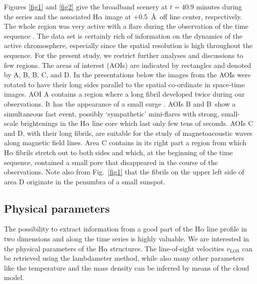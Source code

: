 \vspace{2cm}
\pagebreak
Figures \ref{fig1} and \ref{fig2} give the broadband scenery at $t=40.9$ minutes during the series and the associated H$\alpha$ image at $+$0.5~\AA\ off line center, respectively. The whole region was very active with a flare during the observation of the time sequence \citep{2007msfa.conf..273S}. The data set is certainly rich of information on the dynamics of the active chromosphere, especially since the spatial resolution is high throughout the sequence. For the present study, we restrict further analyses and discussions to few regions. The areas of interest (AOIs) are indicated by rectangles and denoted by A, B, B\arcmin, C, and D. In the presentations below the images from the AOIs were rotated to have their long sides parallel to the spatial co-ordinate in space-time images. AOI A contains a region where a long fibril developed twice during our observations. It has the appearance of a small surge \citep{1977ASSL...69...97T}. AOIs B and B\arcmin\ show a simultaneous fast event, possibly `sympathetic' mini-flares with strong, small-scale brightenings in the H$\alpha$ line core which last only few tens of seconds. AOIs C and D, with their long fibrils, are suitable for the study of magnetoacoustic waves along magnetic field lines. Area C contains in its right part a region from which H$\alpha$ fibrils stretch out to both sides and which, at the beginning of the time sequence, contained a small pore that disappeared in the course of the observations. Note also from Fig.~\ref{fig1} that the fibrils on the upper left side of area D originate in the penumbra of a small sunspot. 


\subsection{Physical parameters\label{physpar}}
The possibility to extract information from a good part of the H$\alpha$ line profile in two dimensions and along the time series is highly valuable.
We are {interested} in the physical {parameters} of the H$\alpha$ structures. The line-of-sight velocities $v_\mathrm{LOS}$ can be retrieved using the lambdameter method, while also many other parameters like the temperature and the mass density can be inferred by means of the cloud model.

